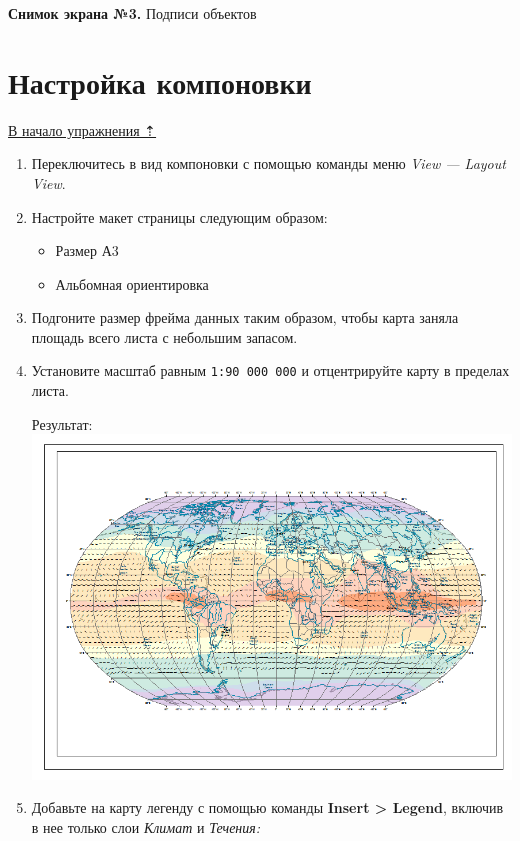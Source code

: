 \documentclass[]{book}
\providecommand{\tightlist}{%
  \setlength{\itemsep}{0pt}\setlength{\parskip}{0pt}}
\theoremstyle{definition}
\theoremstyle{definition}
\theoremstyle{definition}
\theoremstyle{remark}
\begin{document}
\textbf{Снимок экрана №3.} Подписи объектов

\hypertarget{map-design-climates-layout}{%
\section{Настройка компоновки}\label{map-design-climates-layout}}

\protect\hyperlink{map-design-climates}{В начало упражнения ⇡}

\begin{enumerate}
\def\labelenumi{\arabic{enumi}.}
\item
  Переключитесь в вид компоновки с помощью команды меню \emph{View ---
  Layout View}.
\item
  Настройте макет страницы следующим образом:

  \begin{itemize}
  \tightlist
  \item
    Размер А3
  \item
    Альбомная ориентировка
  \end{itemize}
\item
  Подгоните размер фрейма данных таким образом, чтобы карта заняла
  площадь всего листа с небольшим запасом.
\item
  Установите масштаб равным \texttt{1:90\ 000\ 000} и отцентрируйте
  карту в пределах листа.

  Результат: \includegraphics{images/Ex03/image30.png}
\item
  Добавьте на карту легенду с помощью команды \textbf{Insert
  \textgreater{} Legend}, включив в нее только слои \emph{Климат} и
  \emph{Течения:}


\end{enumerate}
\end{document}
